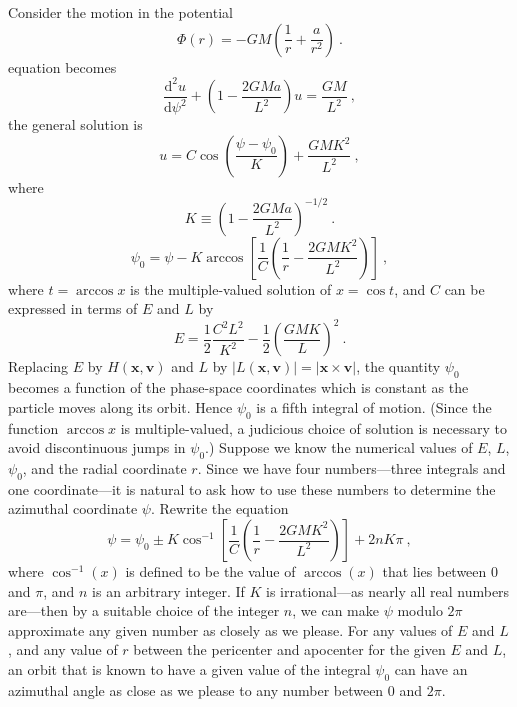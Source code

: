 \documentclass[12pt,a4paper]{article}
\renewcommand{\vec}[1]{\boldsymbol{#1}}
\newcommand{\dif}{\mathrm{d}}
\begin{document}
Consider the motion in the potential
\begin{equation}
\Phi(r) = -GM \left(\frac{1}{r} +\frac{a}{r^2} \right) ~.
\end{equation}
equation becomes
\begin{equation}
\frac{\dif^2 u}{\dif \psi^2}  +\left(1 -\frac{2GMa}{L^2} \right)u = \frac{GM}{L^2} ~,
\end{equation}
the general solution is
\begin{equation}
u = C \cos \left(\frac{\psi -\psi_0}{K} \right) +\frac{GMK^2}{L^2} ~,
\end{equation}
where
\begin{equation}
K \equiv \left(1 -\frac{2GMa}{L^2} \right)^{-1/2} ~.
\end{equation}
\begin{equation}
\psi_0 = \psi - K \arccos \left[\frac{1}{C}\left(\frac{1}{r} -\frac{2GMK^2}{L^2}\right) \right] ~,
\end{equation}
where $t = \arccos x$ is the multiple-valued solution of $x = \cos t$, and $C$ can be expressed in terms of $E$ and $L$ by
\begin{equation}
E = \frac{1}{2} \frac{C^2 L^2}{K^2} - \frac{1}{2}\left(\frac{GMK}{L}\right)^2 ~.
\end{equation}
Replacing $E$ by $H(\vec{x}, \vec{v})$ and $L$ by $|L(\vec{x}, \vec{v})| = |\vec{x} \times \vec{v}|$, the quantity $\psi_0$ becomes a function of the phase-space coordinates which is constant as the particle moves along its orbit. Hence $\psi_0$ is a fifth integral of motion. (Since the function $\arccos x$ is multiple-valued, a judicious choice of solution is necessary to avoid discontinuous jumps in $\psi_0$.) Suppose we know the numerical values of $E$, $L$, $\psi_0$, and the radial coordinate $r$. Since we have four numbers—three integrals and one coordinate—it is natural to ask how to use these numbers to determine the azimuthal coordinate $\psi$. Rewrite the equation
\begin{equation}
\psi = \psi_0 \pm K \cos^{-1} \left[\frac{1}{C}\left(\frac{1}{r} -\frac{2GMK^2}{L^2}\right) \right] +2nK\pi ~,
\end{equation}
where $\cos^{-1}(x)$ is defined to be the value of $\arccos(x)$ that lies between $0$ and $\pi$, and $n$ is an arbitrary integer. If $K$ is irrational---as nearly all real numbers are---then by a suitable choice of the integer $n$, we can make $\psi$ modulo $2\pi$ approximate any given number as closely as we please. For any values of $E$ and $L$, and any value of $r$ between the pericenter and apocenter for the given $E$ and $L$, an orbit that is known to have a given value of the integral $\psi_0$ can have an azimuthal angle as close as we please to any number between $0$ and $2\pi$.
\end{document}
